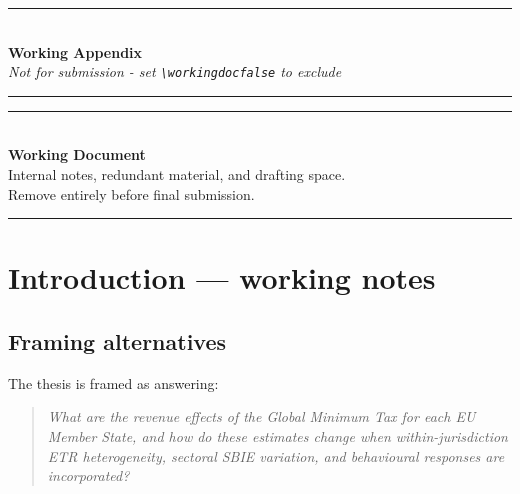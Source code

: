 \documentclass[11pt,a4paper]{article}
\begin{document}
\ifworkingdoc

\newpage

\begin{center}
  \rule{\textwidth}{1pt}\\[0.8em]
  {\Large\bfseries Working Appendix}\\[0.4em]
  {\normalsize\itshape Not for submission - set \texttt{\textbackslash workingdocfalse} to exclude}\\[0.8em]
  \rule{\textwidth}{1pt}
\end{center}

\vspace{1em}

\renewcommand{\thesection}{W.\arabic{section}}
\setcounter{section}{0}
\setcounter{table}{0}
\setcounter{figure}{0}
\setcounter{equation}{0}

\begin{center}
\rule{0.8\textwidth}{1pt}\\[1em]
{\Large\bfseries Working Document}\\[0.5em]
{\normalsize Internal notes, redundant material, and drafting space.\\Remove entirely before final submission.}\\[0.5em]
\rule{0.8\textwidth}{1pt}
\end{center}


\section{Introduction --- working notes}\label{w:intro}

\subsection{Framing alternatives}

The thesis is framed as answering:

\begin{quote}
\textit{What are the revenue effects of the Global Minimum Tax for each EU Member State, and how do these estimates change when within-jurisdiction ETR heterogeneity, sectoral SBIE variation, and behavioural responses are incorporated?}
\end{quote}
\end{document}
